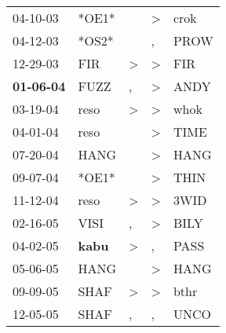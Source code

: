 \begin{supertabular}{p{0.07\textwidth}p{0.06\textwidth}p{0.02\textwidth}p{0.02\textwidth}p{0.06\textwidth}}
          04-10-03\textsuperscript{} &                            *OE1* &                  &  \textgreater &           crok\textsuperscript{} \\
          04-12-03\textsuperscript{} &                            *OS2* &                  &             , &           PROW\textsuperscript{} \\
          12-29-03\textsuperscript{} &            FIR\textsuperscript{} &     \textgreater &  \textgreater &            FIR\textsuperscript{} \\
 \textbf{01-06-04\textsuperscript{}} &           FUZZ\textsuperscript{} &                , &  \textgreater &           ANDY\textsuperscript{} \\
          03-19-04\textsuperscript{} &           reso\textsuperscript{} &     \textgreater &  \textgreater &           whok\textsuperscript{} \\
          04-01-04\textsuperscript{} &           reso\textsuperscript{} &                  &  \textgreater &           TIME\textsuperscript{} \\
          07-20-04\textsuperscript{} &           HANG\textsuperscript{} &                  &  \textgreater &           HANG\textsuperscript{} \\
          09-07-04\textsuperscript{} &                            *OE1* &                  &  \textgreater &           THIN\textsuperscript{} \\
          11-12-04\textsuperscript{} &           reso\textsuperscript{} &     \textgreater &  \textgreater &           3WID\textsuperscript{} \\
          02-16-05\textsuperscript{} &           VISI\textsuperscript{} &                , &  \textgreater &           BILY\textsuperscript{} \\
          04-02-05\textsuperscript{} &  \textbf{kabu\textsuperscript{}} &     \textgreater &             , &           PASS\textsuperscript{} \\
          05-06-05\textsuperscript{} &           HANG\textsuperscript{} &                  &  \textgreater &           HANG\textsuperscript{} \\
          09-09-05\textsuperscript{} &           SHAF\textsuperscript{} &     \textgreater &  \textgreater &           bthr\textsuperscript{} \\
          12-05-05\textsuperscript{} &           SHAF\textsuperscript{} &                , &             , &           UNCO\textsuperscript{} \\

\end{supertabular}
